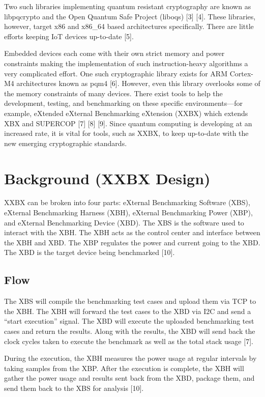 \documentclass[10pt]{article}
\begin{document}
Two such libraries implementing quantum resistant cryptography are known as libpqcrypto and the 
Open Quantum Safe Project (liboqs) [3] [4]. These libraries, however, target x86 and x86\_64 based 
architectures specifically. There are little efforts keeping IoT devices up-to-date [5].

Embedded devices each come with their own strict memory and power constraints making the 
implementation of such instruction-heavy algorithms a very complicated effort. One such 
cryptographic library exists for ARM Cortex-M4 architectures known as pqm4 [6]. 
However, even this library overlooks some of the memory constraints of many devices. 
There exist tools to help the development, testing, and benchmarking on these specific 
environments—for example, eXtended eXternal Benchmarking eXtension (XXBX) which extends 
XBX and SUPERCOP [7] [8] [9].  Since quantum computing is developing at an increased rate, 
it is vital for tools, such as XXBX, to keep up-to-date with the 
new emerging cryptographic standards.

\section{Background (XXBX Design)}

XXBX can be broken into four parts: eXternal Benchmarking Software (XBS), eXternal 
Benchmarking Harness (XBH), eXternal Benchmarking Power (XBP), and 
eXternal Benchmarking Device (XBD). The XBS is the software used to interact with the XBH. 
The XBH acts as the control center and interface between the XBH and XBD. The XBP regulates 
the power and current going to the XBD. The XBD is the target device being benchmarked [10].

\subsection{Flow}
The XBS will compile the benchmarking test cases and upload them via TCP to the XBH. 
The XBH will forward the test cases to the XBD via I2C and send a ``start execution'' signal. 
The XBD will execute the uploaded benchmarking test cases and return the results. 
Along with the results, the XBD will send back the clock cycles taken to execute the 
benchmark as well as the total stack usage [7].

During the execution, the XBH measures the power usage at regular intervals by taking 
samples from the XBP. After the execution is complete, the XBH will gather the power 
usage and results sent back from the XBD, package them, and send them back to the XBS 
for analysis [10].
\end{document}

